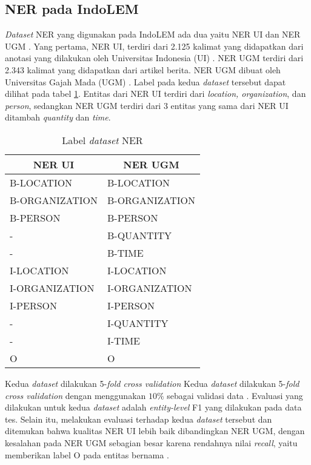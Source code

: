 \subsection{NER pada IndoLEM}

\textit{Dataset} NER yang digunakan pada IndoLEM ada dua yaitu NER UI dan NER UGM \parencite{indolem}. Yang pertama, NER UI, terdiri dari 2.125 kalimat yang didapatkan dari anotasi yang dilakukan oleh Universitas Indonesia (UI) \parencite{indolem}. NER UGM terdiri dari 2.343 kalimat yang didapatkan dari artikel berita. NER UGM dibuat oleh Universitas Gajah Mada (UGM) \parencite{indolem}. Label pada kedua \textit{dataset} tersebut dapat dilihat pada tabel \ref{table:label-ner}. Entitas dari NER UI terdiri dari \textit{location, organization}, dan \textit{person}, sedangkan NER UGM terdiri dari 3 entitas yang sama dari NER UI ditambah \textit{quantity} dan \textit{time}.

\begin{table}[h]
    \vspace{0.25cm}
    \centering
    \caption{Label \textit{dataset} NER}
    \label{table:label-ner}
    \begin{tabular}{l|l}
        \toprule
        \multicolumn{1}{c}{\textbf{NER UI}} & \multicolumn{1}{c}{\textbf{NER UGM}} \\
        \midrule
        B-LOCATION & B-LOCATION \\
        B-ORGANIZATION & B-ORGANIZATION \\
        B-PERSON & B-PERSON \\
        - & B-QUANTITY \\
        - & B-TIME \\
        I-LOCATION & I-LOCATION \\
        I-ORGANIZATION & I-ORGANIZATION \\
        I-PERSON & I-PERSON \\
        - & I-QUANTITY \\
        - & I-TIME \\
        O & O \\
        \bottomrule
    \end{tabular}
\end{table}

Kedua \textit{dataset} dilakukan 5-\textit{fold cross validation} Kedua \textit{dataset} dilakukan 5-\textit{fold cross validation} dengan menggunakan $10\%$ sebagai validasi data \parencite{indolem}. Evaluasi yang dilakukan untuk kedua \textit{dataset} adalah \textit{entity-level} F1 yang dilakukan pada data tes. Selain itu, \citeauthor{indolem} melakukan evaluasi terhadap kedua \textit{dataset} tersebut dan ditemukan bahwa kualitas NER UI lebih baik dibandingkan NER UGM, dengan kesalahan pada NER UGM sebagian besar karena rendahnya nilai \textit{recall}, yaitu memberikan label O pada entitas bernama \parencite{indolem}.

